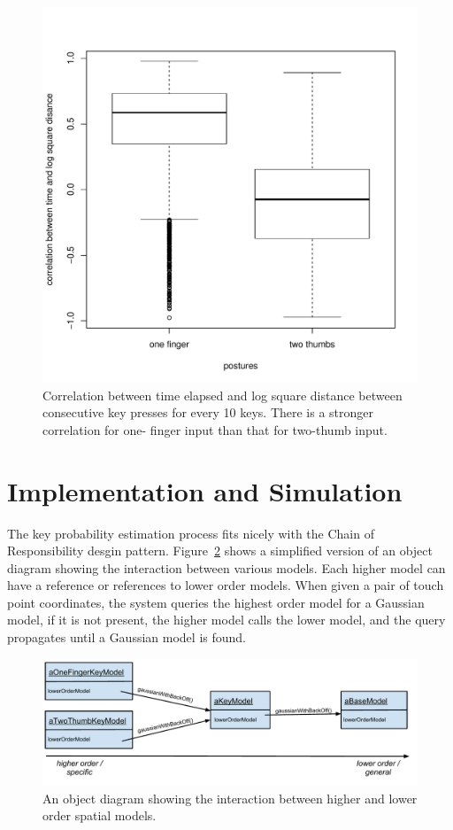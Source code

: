 \documentclass{sigchi}
\begin{document}
\begin{figure}[tb]
  \centering
  \includegraphics[width=0.8\columnwidth]{figures/boxplot.pdf}
  \caption{Correlation between time elapsed and log square distance between
  consecutive key presses for every 10 keys. There is a stronger correlation for
  one- finger input than that for two-thumb input.}
  \label{fig:boxplot}
\end{figure}

\section{Implementation and Simulation}
The key probability estimation process fits nicely with the
Chain of Responsibility desgin pattern.
Figure~\ref{fig:chain-of-responsibility} shows a simplified version of an object
diagram showing the interaction between various models. Each higher model can
have a reference or references to lower order models. When given a pair of touch
point coordinates, the system queries the highest order model for a Gaussian
model, if it is not present, the higher model calls the lower model, and the
query propagates until a Gaussian model is found.

\begin{figure}[tb]
  \centering
  \includegraphics[width=1\columnwidth]{figures/chain-of-responsibility.pdf}
  \caption{An object diagram showing the interaction between higher and lower
  order spatial models.}
  \label{fig:chain-of-responsibility}
\end{figure}
\end{document}
